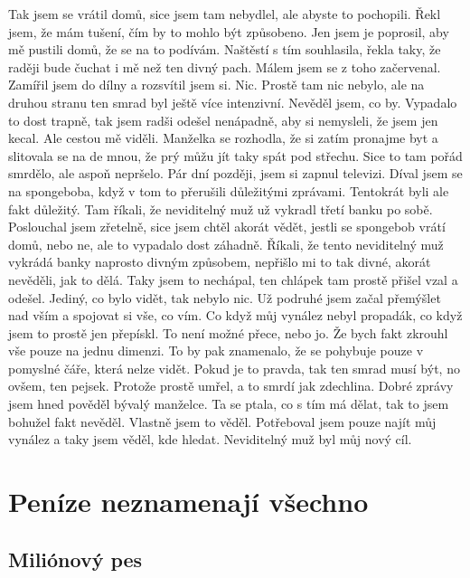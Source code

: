 Tak jsem se vrátil domů, sice jsem tam nebydlel, ale abyste to pochopili. Řekl jsem, že mám tušení, čím by to mohlo být způsobeno. Jen jsem je poprosil, aby mě pustili domů, že se na to podívám. Naštěstí s tím souhlasila, řekla taky, že raději bude čuchat i mě než ten divný pach. Málem jsem se z toho začervenal. Zamířil jsem do dílny a rozsvítil jsem si. Nic. Prostě tam nic nebylo, ale na druhou stranu ten smrad byl ještě více intenzivní. Nevěděl jsem, co by. Vypadalo to dost trapně, tak jsem radši odešel nenápadně, aby si nemysleli, že jsem jen kecal. Ale cestou mě viděli. Manželka se rozhodla, že si zatím pronajme byt a slitovala se na de mnou, že prý můžu jít taky spát pod střechu. Sice to tam pořád smrdělo, ale aspoň nepršelo. Pár dní později, jsem si zapnul televizi. Díval jsem se na spongeboba, když v tom to přerušili důležitými zprávami. Tentokrát byli ale fakt důležitý. Tam říkali, že neviditelný muž už vykradl třetí banku po sobě. Poslouchal jsem zřetelně, sice jsem chtěl akorát vědět, jestli se spongebob vrátí domů, nebo ne, ale to vypadalo dost záhadně. Říkali, že tento neviditelný muž vykrádá banky naprosto divným způsobem, nepřišlo mi to tak divné, akorát nevěděli, jak to dělá. Taky jsem to nechápal, ten chlápek tam prostě přišel vzal a odešel. Jediný, co bylo vidět, tak nebylo nic. Už podruhé jsem začal přemýšlet nad vším a spojovat si vše, co vím. Co když můj vynález nebyl propadák, co když jsem to prostě jen přepískl. To není možné přece, nebo jo. Že bych fakt zkrouhl vše pouze na jednu dimenzi. To by pak znamenalo, že se pohybuje pouze v pomyslné čáře, která nelze vidět. Pokud je to pravda, tak ten smrad musí být, no ovšem, ten pejsek. Protože prostě umřel, a to smrdí jak zdechlina. Dobré zprávy jsem hned pověděl bývalý manželce. Ta se ptala, co s tím má dělat, tak to jsem bohužel fakt nevěděl. Vlastně jsem to věděl. Potřeboval jsem pouze najít můj vynález a taky jsem věděl, kde hledat. Neviditelný muž byl můj nový cíl.

\chapter{Peníze neznamenají všechno}

\section{Miliónový pes}

